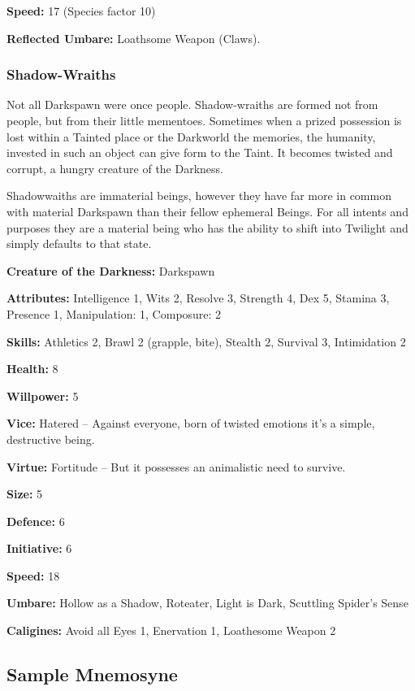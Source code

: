 \noindent \textbf{Speed:} 17 (Species factor 10)

\noindent \textbf{Reflected Umbare:} Loathsome Weapon (Claws).

\subsubsection*{Shadow-Wraiths}

Not all Darkspawn were once people. Shadow-wraiths are formed not from people, but from their little mementoes. Sometimes when a prized possession is lost within a Tainted place or the Darkworld the memories, the humanity, invested in such an object can give form to the Taint. It becomes twisted and corrupt, a hungry creature of the Darkness.

Shadowwaiths are immaterial beings, however they have far more in common with material Darkspawn than their fellow ephemeral Beings. For all intents and purposes they are a material being who has the ability to shift into Twilight and simply defaults to that state. 

\noindent \textbf{Creature of the Darkness:} Darkspawn

\noindent \textbf{Attributes:} Intelligence 1, Wits 2, Resolve 3, Strength 4, Dex 5, Stamina 3, Presence 1, Manipulation: 1, Composure: 2

\noindent \textbf{Skills:} Athletics 2, Brawl 2 (grapple, bite), Stealth 2, Survival 3, Intimidation 2

\noindent \textbf{Health:} 8

\noindent \textbf{Willpower:} 5

\noindent \textbf{Vice:} Hatered – Against everyone, born of twisted emotions it's a simple, destructive being.

\noindent \textbf{Virtue:} Fortitude – But it possesses an animalistic need to survive.

\noindent \textbf{Size:} 5

\noindent \textbf{Defence:} 6

\noindent \textbf{Initiative:} 6

\noindent \textbf{Speed:} 18

\noindent \textbf{Umbare:} Hollow as a Shadow, Roteater, Light is Dark, Scuttling Spider's Sense

\noindent \textbf{Caligines:} Avoid all Eyes 1, Enervation 1, Loathesome Weapon 2

\subsection*{Sample Mnemosyne}


